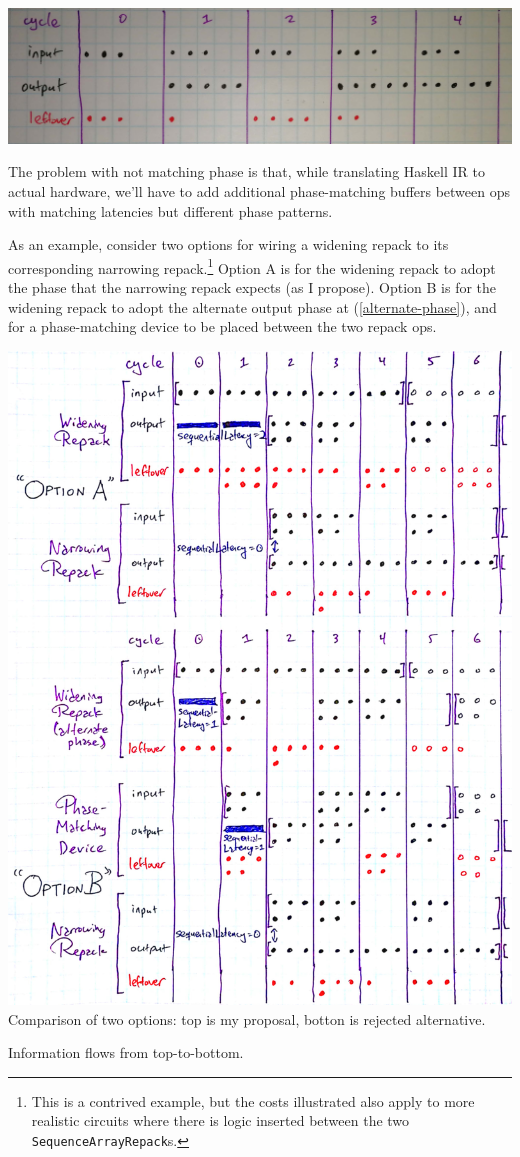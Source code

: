 \documentclass[12pt]{article}
\begin{document}
\begin{center}
\includegraphics[width=1.0\linewidth]{Figures/alternate-widening.jpg}
\end{center}

The problem with not matching phase is that, while translating Haskell
IR to actual hardware, we'll have to add additional phase-matching
buffers between ops with matching latencies but different phase
patterns.

As an example, consider two options for wiring a widening repack to
its corresponding narrowing repack.\footnote{This is a contrived
  example, but the costs illustrated also apply to more realistic
  circuits where there is logic inserted between the two
  \texttt{SequenceArrayRepack}s.  } Option A is for the widening
repack to adopt the phase that the narrowing repack expects (as I
propose). Option B is for the widening repack to adopt the alternate
output phase at (\ref{alternate-phase}), and for a phase-matching
device to be placed between the two repack ops.

\begin{center}
\includegraphics[width=1.0\linewidth]{Figures/phase-comparison.jpg}
Comparison of two options: top is my proposal, botton is rejected alternative.

Information flows from top-to-bottom.
\end{center}
\end{document}
